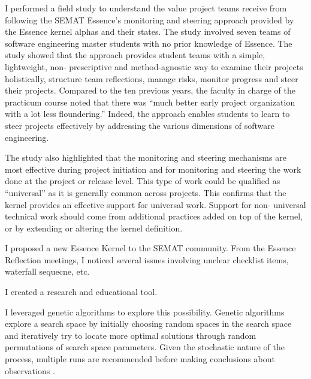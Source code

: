 \documentclass[preprint,12pt,3p]{elsarticle}
\begin{document}
I performed a field study \cite{ICSE2014} to understand the value project teams receive from following the SEMAT Essence’s monitoring and steering approach provided by the Essence kernel alphas and their states. The study involved seven teams of software engineering master students with no prior knowledge of Essence. The study showed that the approach provides student teams with a simple, lightweight, non- prescriptive and method-agnostic way to examine their projects holistically, structure team reflections, manage risks, monitor progress and steer their projects. Compared to the ten previous years, the faculty in charge of the practicum course noted that there was “much better early project organization with a lot less floundering.” Indeed, the approach enables students to learn to steer projects effectively by addressing the various dimensions of software engineering.

The study also highlighted that the monitoring and steering mechanisms are most effective during project initiation and for monitoring and steering the work done at the project or release level. This type of work could be qualified as “universal” as it is generally common across projects. This confirms that the kernel provides an effective support for universal work. Support for non- universal technical work should come from additional practices added on top of the kernel, or by extending or altering the kernel definition.

I proposed a new Essence Kernel to the SEMAT community. From the Essence Reflection meetings, I noticed several issues involving unclear checklist items, waterfall sequecne, etc.

I created a research and educational tool. 

I leveraged genetic algorithms to explore this possibility. Genetic algorithms explore a search space by initially choosing random spaces in the search space and iteratively try to locate more optimal solutions through random permutations of search space parameters. Given the stochastic nature of the process, multiple runs are recommended before making conclusions about observations \cite{Goldberg1989, Holland1992}.
\end{document}
